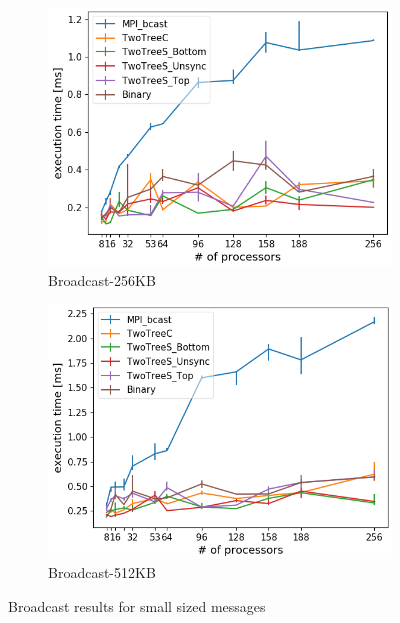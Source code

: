 \documentclass[sigplan,review,anonymous]{acmart}\settopmatter{printfolios=true,printccs=false,printacmref=false}
\begin{document}
\begin{figure}
\centering
\begin{subfigure}{.25\textwidth}
  \centering
  \includegraphics[width=1\linewidth]{images/Results/bcastFinal_262144B.png}
  \caption{Broadcast-256KB}
  \label{bcast-selected-256B}
\end{subfigure}%
\begin{subfigure}{.25\textwidth}
  \centering
  \includegraphics[width=1\linewidth]{images/Results/bcastFinal_524288B.png}
  \caption{Broadcast-512KB}
  \label{bcast-selected-512B}
\end{subfigure}
\caption{Broadcast results for small sized messages}
\label{graph-bcast-small-selected}
\end{figure}
\end{document}
